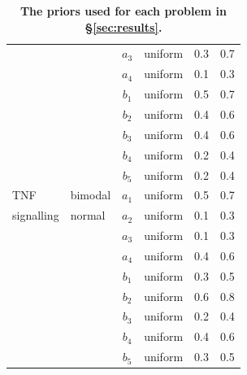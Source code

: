 \begin{table}[H]
\begin{adjustwidth}{0in}{0in}
\begin{tabularx}{1.0\textwidth}{llclcc}
&& $a_3$ & uniform & 0.3 & 0.7\\
&& $a_4$ & uniform & 0.1 & 0.3\\
&& $b_1$ & uniform & 0.5 & 0.7\\
&& $b_2$ & uniform & 0.4 & 0.6\\
&& $b_3$ & uniform & 0.4 & 0.6\\
&& $b_4$ & uniform & 0.2 & 0.4\\
&& $b_5$ & uniform & 0.2 & 0.4\\
\toprule
TNF  & bimodal  & $a_1$ & uniform & 0.5 & 0.7\\
signalling& normal & $a_2$ & uniform & 0.1 & 0.3\\
&& $a_3$ & uniform & 0.1 & 0.3\\
&& $a_4$ & uniform & 0.4 & 0.6\\
&& $b_1$ & uniform & 0.3 & 0.5\\
&& $b_2$ & uniform & 0.6 & 0.8\\
&& $b_3$ & uniform & 0.2 & 0.4\\
&& $b_4$ & uniform & 0.4 & 0.6\\
&& $b_5$ & uniform & 0.3 & 0.5\\
\end{tabularx}
\caption{\textbf{The priors used for each problem in \S\ref{sec:results}.}}
\label{tab:priors}
\end{adjustwidth}
\end{table}
